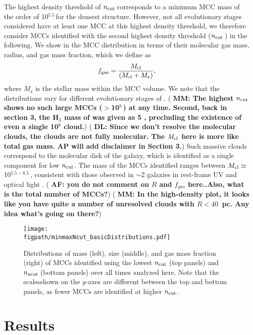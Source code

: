 \IfFileExists{emulateapjlegacy.cls}{\documentclass[iop]{emulateapjlegacy}}{\documentclass[iop]{emulateapj}}
\newcommand{\DL}[1]{({\bf \color{dlcolor} DL: #1})}
\newcommand{\AF}[1]{({\bf \color{afcolor} AF: #1})}
\newcommand{\MM}[1]{({\bf \color{mmcolor} MM: #1})}
\def\figpath{./Fig}
\begin{document}
The highest density threshold of $n_{\rm cut}$\,\cc corresponds to 
a minimum MCC mass of the order of 10$^{5.5}$\,\Msun for the densest structure.
However, not all evolutionary stages considered have at least one MCC at this highest density threshold, 
we therefore consider MCCs identified with the second highest density threshold  ($n_{\rm cut}$\,\cc) in the following. 
We show in  the MCC distribution in terms of their molecular gas mass, radius, and gas mass fraction, which we define as
\begin{equation}
f_{\rm gas} = \frac{M_{\rm cl}} {\left(M_{\rm cl} + M_\star\right)},
\end{equation}
where $M_\star$ is the stellar mass within the MCC volume.
%
We note that the distributions vary for different evolutionary stages of \flower. 
%
\MM{The highest $n_{\rm cut}$ shows no such large MCCs ($>$10$^8$\,\Msun) at any time.  Second,
  back in section 3, the H$_2$ mass of \flower was given as 5\E{7}
  \Msun, precluding the existence of even a single 10$^8$ \Msun
  cloud.} 
\DL{Since we don't resolve the molecular clouds, the clouds are not fully molecular. The $M_{\rm cl}$ here is more 
like total gas mass. AP will add disclaimer in Section 3.}
  Such massive clouds correspond to the molecular disk of the
galaxy, which is identified as a single component for low $n_{\rm
  cut}$. The mass of the MCCs identified ranges between $M_{\rm
  cl}\simeq$10$^{5.5-8.5}$\,\Msun, consistent with those observed in
\z$\sim$2 galaxies in rest-frame UV and optical light
\citep{Elmegreen07a, Elmegreen09a}. \AF{you do not comment on $R$ and
  $f_{gas}$ here..Also, what is the total number of MCCs?} \MM{In the
  high-density plot, it looks like you have quite a number of
  unresolved clouds with $R < 40$~pc. Any idea what's going on there?}

\begin{figure*}[htbp]
\centering
\texttt{[image: \\figpath/minmaxNcut\_basicDistributions.pdf]}
\caption{Distributions of mass (left), size (middle), and gas mass
  fraction (right) of MCCs identified using the lowest $n_{\rm cut}$
  (top panels) and $n_{\rm ncut}$\,\cc (bottom panels)
      over all times analyzed here.
Note that the scalesshown on the $y$-axes are different between the top
and bottom panels, as fewer MCCs are identified at higher $n_{\rm
  cut}$. 
\label{fig:dist}}
\end{figure*}


\section{Results}\label{sec:results}
\end{document}
